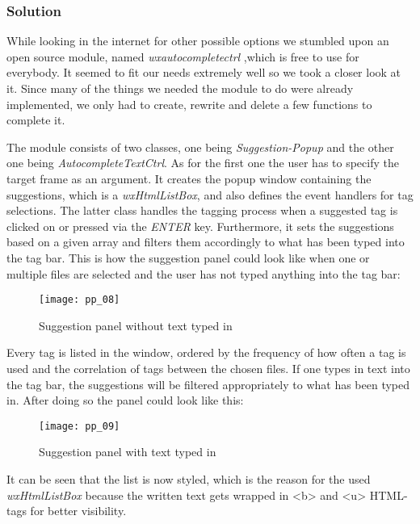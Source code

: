 \subsubsection{Solution}
While looking in the internet for other possible options we stumbled upon an open source module, named \emph{wxautocompletectrl} \cite{autocomplete},which is free to use for everybody. It seemed to fit our needs extremely well so we took a closer look at it. Since many of the things we needed the module to do were already implemented, we only had to create, rewrite and delete a few functions to complete it. 

The module consists of two classes, one being \textit{Suggestion-Popup} and the other one being \textit{AutocompleteTextCtrl}. As for the first one the user has to specify the target frame as an argument. It creates the popup window containing the suggestions, which is a \textit{wxHtmlListBox}, and also defines the event handlers for tag selections. The latter class handles the tagging process when a suggested tag is clicked on or pressed via the \textit{ENTER} key. Furthermore, it sets the suggestions based on a given array and filters them accordingly to what has been typed into the tag bar.
This is how the suggestion panel could look like when one or multiple files are selected and the user has not typed anything into the tag bar:

\begin{figure}[H]
    \centering
    \texttt{[image: pp\_08]}
    \caption{Suggestion panel without text typed in}
\end{figure}

Every tag is listed in the window, ordered by the frequency of how often a tag is used and the correlation of tags between the chosen files. If one types in text into the tag bar, the suggestions will be filtered appropriately to what has been typed in. After doing so the panel could look like this:

\begin{figure}[H]
    \centering
    \texttt{[image: pp\_09]}
    \caption{Suggestion panel with text typed in}
\end{figure}

It can be seen that the list is now styled, which is the reason for the used \textit{wxHtmlListBox} because the written text gets wrapped in <b> and <u> HTML-tags for better visibility.


